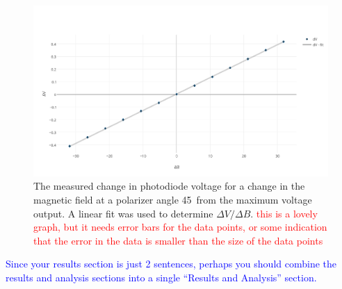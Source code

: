 \documentclass[prb,preprint]{revtex4-1}
\begin{document}
{\begin{figure}
\includegraphics[width =6.3in]{verdetpic2.pdf}
\caption{\label{method1pic} The measured change in photodiode voltage for a change in the magnetic field at a polarizer angle 45\degree\  from the maximum voltage output. A linear fit was used to determine $\Delta V/\Delta B$. \textcolor{red}{this is a lovely graph, but it needs error bars for the data points, or some indication that the error in the data is smaller than the size of the data points}}
\end{figure}
}

\textcolor{blue}{Since your results section is just 2 sentences, perhaps you should combine the results and analysis sections into a single ``Results and Analysis'' section.}
\end{document}

